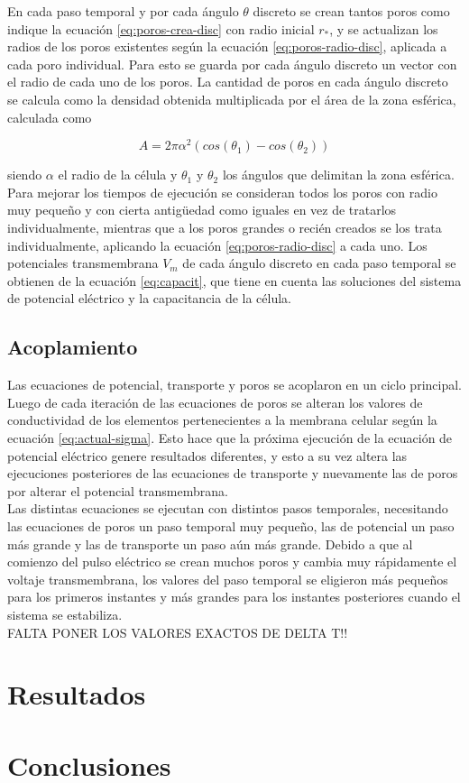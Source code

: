 \documentclass[a4paper,10pt]{article}
\begin{document}
En cada paso temporal y por cada ángulo $\theta$ discreto se crean tantos poros como indique la ecuación \ref{eq:poros-crea-disc} con radio inicial $r_*$, y se actualizan los radios de los poros existentes según la ecuación \ref{eq:poros-radio-disc}, aplicada a cada poro individual. Para esto se guarda por cada ángulo discreto un vector con el radio de cada uno de los poros. La cantidad de poros en cada ángulo discreto se calcula como la densidad obtenida multiplicada por el área de la zona esférica, calculada como 

\begin{equation}
	A = 2 \pi \alpha^2 (cos(\theta_1) - cos(\theta_2))
\end{equation}

siendo $\alpha$ el radio de la célula y $\theta_1$ y $\theta_2$ los ángulos que delimitan la zona esférica.\\

Para mejorar los tiempos de ejecución se consideran todos los poros con radio muy pequeño y con cierta antigüedad como iguales en vez de tratarlos individualmente, mientras que a los poros grandes o recién creados se los trata individualmente, aplicando la ecuación \ref{eq:poros-radio-disc} a cada uno. Los potenciales transmembrana $V_m$ de cada ángulo discreto en cada paso temporal se obtienen de la ecuación \ref{eq:capacit}, que tiene en cuenta las soluciones del sistema de potencial eléctrico y la capacitancia de la célula.\\

\subsection{Acoplamiento}
Las ecuaciones de potencial, transporte y poros se acoplaron en un ciclo principal. Luego de cada iteración de las ecuaciones de poros se alteran los valores de conductividad de los elementos pertenecientes a la membrana celular según la ecuación \ref{eq:actual-sigma}. Esto hace que la próxima ejecución de la ecuación de potencial eléctrico genere resultados diferentes, y esto a su vez altera las ejecuciones posteriores de las ecuaciones de transporte y nuevamente las de poros por alterar el potencial transmembrana.\\

Las distintas ecuaciones se ejecutan con distintos pasos temporales, necesitando las ecuaciones de poros un paso temporal muy pequeño, las de potencial un paso más grande y las de transporte un paso aún más grande. Debido a que al comienzo del pulso eléctrico se crean muchos poros y cambia muy rápidamente el voltaje transmembrana, los valores del paso temporal se eligieron más pequeños para los primeros instantes y más grandes para los instantes posteriores cuando el sistema se estabiliza.\\

FALTA PONER LOS VALORES EXACTOS DE DELTA T!!

\section{Resultados}

\section{Conclusiones}
\end{document}
